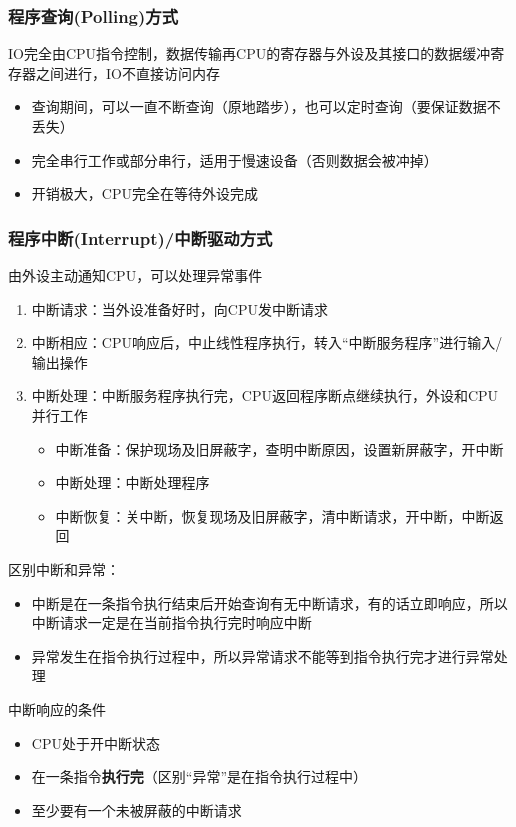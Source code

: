 \subsubsection{程序查询(Polling)方式}
IO完全由CPU指令控制，数据传输再CPU的寄存器与外设及其接口的数据缓冲寄存器之间进行，IO不直接访问内存
\begin{itemize}
	\item 查询期间，可以一直不断查询（原地踏步），也可以定时查询（要保证数据不丢失）
	\item 完全串行工作或部分串行，适用于慢速设备（否则数据会被冲掉）
	\item 开销极大，CPU完全在等待外设完成
\end{itemize}

\subsubsection{程序中断(Interrupt)/中断驱动方式}
由外设主动通知CPU，可以处理异常事件
\begin{enumerate}
	\item 中断请求：当外设准备好时，向CPU发中断请求
	\item 中断相应：CPU响应后，中止线性程序执行，转入“中断服务程序”进行输入/输出操作
	\item 中断处理：中断服务程序执行完，CPU返回程序断点继续执行，外设和CPU并行工作
	\begin{itemize}
		\item 中断准备：保护现场及旧屏蔽字，查明中断原因，设置新屏蔽字，开中断
		\item 中断处理：中断处理程序
		\item 中断恢复：关中断，恢复现场及旧屏蔽字，清中断请求，开中断，中断返回
	\end{itemize}
\end{enumerate}
区别中断和异常：
\begin{itemize}
	\item 中断是在一条指令执行结束后开始查询有无中断请求，有的话立即响应，所以中断请求一定是在当前指令执行完时响应中断
	\item 异常发生在指令执行过程中，所以异常请求不能等到指令执行完才进行异常处理
\end{itemize}
中断响应的条件
\begin{itemize}
	\item CPU处于开中断状态
	\item 在一条指令\textbf{执行完}（区别“异常”是在指令执行过程中）
	\item 至少要有一个未被屏蔽的中断请求
\end{itemize}
